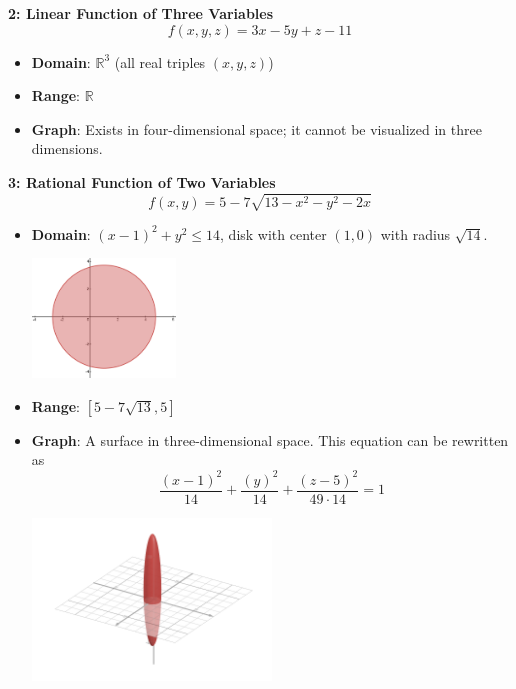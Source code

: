 \documentclass[a4paper,12pt,openany]{book}
\begin{document}
\textbf{2: Linear Function of Three Variables}
    \[
    f(x, y, z) = 3x - 5y + z - 11
    \]
    \begin{itemize}
        \item \textbf{Domain}: \(\mathbb{R}^3\) (all real triples \((x, y, z)\))
        \item \textbf{Range}: \(\mathbb{R}\)
        \item \textbf{Graph}: Exists in four-dimensional space; it cannot be visualized in three dimensions.
    \end{itemize}
\textbf{3: Rational Function of Two Variables}
    \[
        f(x, y) = 5 - 7 \sqrt{13-x^2-y^2-2x}
    \]
    \begin{itemize}
        \item \textbf{Domain}: $(x-1)^2+y^2 \leq 14$, disk with center $(1, 0)$ with radius $\sqrt{14}$.
        \begin{center}
            \includegraphics[width=0.3\textwidth]{domain1.png}
        \end{center}
        \item \textbf{Range}: $\left[5-7\sqrt{13}, 5\right]$
        \item \textbf{Graph}: A surface in three-dimensional space. This equation can be rewritten as 
        \[
            \dfrac{\left(x-1\right)^{2}}{14}+\dfrac{\left(y\right)^{2}}{14}+\dfrac{\left(z-5\right)^{2}}{49\cdot14}=1
        \] 
        \begin{center}
            \includegraphics[width=0.5\textwidth]{graph1.png}
        \end{center}
    \end{itemize}
\end{document}
